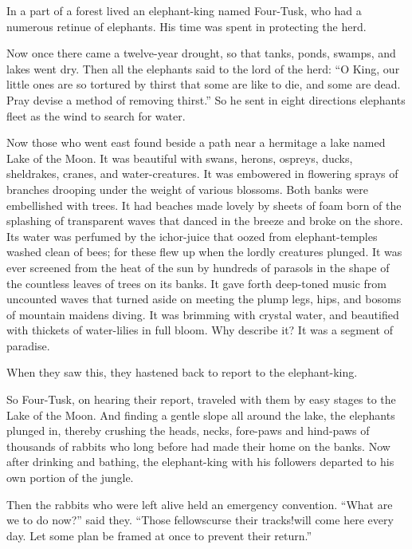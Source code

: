 \documentclass[article, twoside, 14pt]{memoir}
\begin{document}
\label{s49}

In a part of a forest lived an elephant-king named Four-Tusk, who
had a numerous retinue of elephants. His time was spent in
protecting the herd.

Now once there came a twelve-year drought, so that tanks, ponds,
swamps, and lakes went dry. Then all the elephants said to the lord
of the herd:
``O King, our little ones are so tortured by thirst that some are like to die, and some are dead. Pray devise a method of removing thirst.''
So he sent in eight directions elephants fleet as the wind to
search for water.

Now those who went east found beside a path near a hermitage a lake
named Lake of the Moon. It was beautiful with swans, herons,
ospreys, ducks, sheldrakes, cranes, and water-creatures. It was
embowered in flowering sprays of branches drooping under the weight
of various blossoms. Both banks were embellished with trees. It had
beaches made lovely by sheets of foam born of the splashing of
transparent waves that danced in the breeze and broke on the shore.
Its water was perfumed by the ichor-juice that oozed from
elephant-temples washed clean of bees; for these flew up when the
lordly creatures plunged. It was ever screened from the heat of the
sun by hundreds of parasols in the shape of the countless leaves of
trees on its banks. It gave forth deep-toned music from uncounted
waves that turned aside on meeting the plump legs, hips, and bosoms
of mountain maidens diving. It was brimming with crystal water, and
beautified with thickets of water-lilies in full bloom. Why
describe it? It was a segment of paradise.

When they saw this, they hastened back to report to the
elephant-king.

So Four-Tusk, on hearing their report, traveled with them by
easy stages to the Lake of the Moon. And finding a gentle slope all
around the lake, the elephants plunged in, thereby crushing the
heads, necks, fore-paws and hind-paws of thousands of rabbits who
long before had made their home on the banks. Now after drinking
and bathing, the elephant-king with his followers departed to his
own portion of the jungle.

Then the rabbits who were left alive held an emergency convention.
``What are we to do now?'' said they.
``Those fellows{\textemdash}curse their tracks!{\textemdash}will come here every day. Let some plan be framed at once to prevent their return.''
\end{document}
